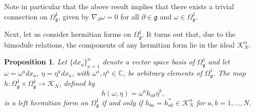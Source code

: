\documentclass{amsart}
\newcommand{\complex}{\mathbb{C}}
\newtheorem{proposition}[theorem]{Proposition}
\theoremstyle{definition}
\theoremstyle{remark}
\numberwithin{equation}{section}
\newcommand{\K}{\mathcal{K}}
\newcommand{\KN}{\K_N}
\newcommand{\KaN}{\K^\alpha_N}
\renewcommand{\d}{\partial}
\newcommand{\g}{\mathfrak{g}}
\newcommand{\Omegaoneg}{\Omega^1_{\g}}
\begin{document}
\noindent
Note in particular that the above result implies that there exists a trivial
connection on $\Omegaoneg$, given by $\nabla_{\d}\omega=0$ for all
$\d\in\g$ and $\omega\in\Omegaoneg$.

Next, let us consider hermitian forms on $\Omegaoneg$. It turns out
that, due to the bimodule relations, the components of any
hermitian form lie in the ideal $\KaN$.

\begin{proposition}\label{prop:hab.in.KaN}
  Let $\{dx_a\}_{a=1}^n$ denote a vector space basis of $\Omegaoneg$
  and let $\omega=\omega^adx_a$, $\eta=\eta^adx_a$, with
  $\omega^a,\eta^a\in\complex$, be arbitrary elements of
  $\Omegaoneg$. The map $h:\Omegaoneg\times\Omegaoneg\to\KN$, defined by
  \begin{equation}\label{eq:def.hform.Omega}
    h(\omega,\eta) = \omega^ah_{ab}\bar{\eta}^b,
  \end{equation}
  is a left hermitian form on $\Omegaoneg$ if and only if
  $h_{ba}=h_{ab}^\ast\in\KaN$ for $a,b=1,\ldots,N$.
\end{proposition}
\end{document}
